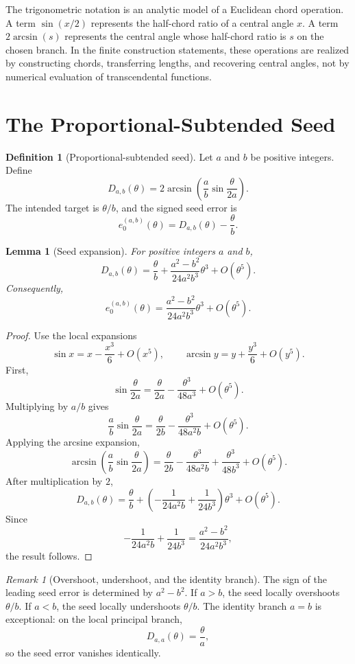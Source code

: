 \documentclass[11pt]{article}
\newtheorem{lemma}[theorem]{Lemma}
\theoremstyle{definition}
\newtheorem{definition}[theorem]{Definition}
\theoremstyle{remark}
\newtheorem{remark}[theorem]{Remark}
\begin{document}
The trigonometric notation is an analytic model of a Euclidean chord
operation.  A term $\sin(x/2)$ represents the half-chord ratio of a central
angle $x$.  A term $2\arcsin(s)$ represents the central angle whose half-chord
ratio is $s$ on the chosen branch.  In the finite construction statements,
these operations are realized by constructing chords, transferring lengths,
and recovering central angles, not by numerical evaluation of transcendental
functions.

\section{The Proportional-Subtended Seed}
\label{sec:seed}

\begin{definition}[Proportional-subtended seed]
Let $a$ and $b$ be positive integers.  Define
\[
D_{a,b}(\theta)
=
2\arcsin\!\left(
\frac{a}{b}\sin\frac{\theta}{2a}
\right).
\]
The intended target is $\theta/b$, and the signed seed error is
\[
e^{(a,b)}_0(\theta)
=
D_{a,b}(\theta)-\frac{\theta}{b}.
\]
\end{definition}

\begin{lemma}[Seed expansion]
\label{lem:seed-expansion}
For positive integers $a$ and $b$,
\[
D_{a,b}(\theta)
=
\frac{\theta}{b}
+
\frac{a^2-b^2}{24a^2b^3}\theta^3
+
O(\theta^5).
\]
Consequently,
\[
e^{(a,b)}_0(\theta)
=
\frac{a^2-b^2}{24a^2b^3}\theta^3
+
O(\theta^5).
\]
\end{lemma}

\begin{proof}
Use the local expansions
\[
\sin x=x-\frac{x^3}{6}+O(x^5),
\qquad
\arcsin y=y+\frac{y^3}{6}+O(y^5).
\]
First,
\[
\sin\frac{\theta}{2a}
=
\frac{\theta}{2a}
-
\frac{\theta^3}{48a^3}
+
O(\theta^5).
\]
Multiplying by $a/b$ gives
\[
\frac{a}{b}\sin\frac{\theta}{2a}
=
\frac{\theta}{2b}
-
\frac{\theta^3}{48a^2b}
+
O(\theta^5).
\]
Applying the arcsine expansion,
\[
\arcsin\!\left(
\frac{a}{b}\sin\frac{\theta}{2a}
\right)
=
\frac{\theta}{2b}
-
\frac{\theta^3}{48a^2b}
+
\frac{\theta^3}{48b^3}
+
O(\theta^5).
\]
After multiplication by $2$,
\[
D_{a,b}(\theta)
=
\frac{\theta}{b}
+
\left(
-
\frac{1}{24a^2b}
+
\frac{1}{24b^3}
\right)\theta^3
+
O(\theta^5).
\]
Since
\[
-
\frac{1}{24a^2b}
+
\frac{1}{24b^3}
=
\frac{a^2-b^2}{24a^2b^3},
\]
the result follows.
\end{proof}

\begin{remark}[Overshoot, undershoot, and the identity branch]
The sign of the leading seed error is determined by $a^2-b^2$.  If $a>b$,
the seed locally overshoots $\theta/b$.  If $a<b$, the seed locally
undershoots $\theta/b$.  The identity branch $a=b$ is exceptional: on the
local principal branch,
\[
D_{a,a}(\theta)=\frac{\theta}{a},
\]
so the seed error vanishes identically.
\end{remark}
\end{document}
